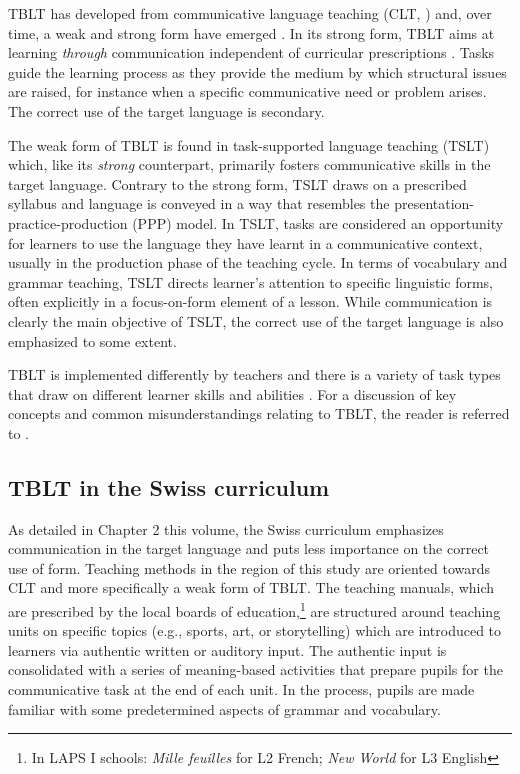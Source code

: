 \documentclass[output=paper]{langsci/langscibook}
\begin{document}
TBLT has developed from communicative language teaching (CLT, \citealt{Krashen1981}) and, over time, a weak and strong form have emerged \citep[109]{Ellis2017}. In its strong form, TBLT aims at learning \textit{through} communication independent of curricular prescriptions \citep{Ellis2017}. Tasks guide the learning process as they provide the medium by which structural issues are raised, for instance when a specific communicative need or problem arises. The correct use of the target language is secondary.

\begin{sloppypar}
The weak form of TBLT is found in task-supported language teaching (TSLT) which, like its \textit{strong} counterpart, primarily fosters communicative skills in the target language. Contrary to the strong form, TSLT draws on a prescribed syllabus and language is conveyed in a way that resembles the presentation-practice-production (PPP) model. In TSLT, tasks are considered an opportunity for learners to use the language they have learnt in a communicative context, usually in the production phase of the teaching cycle. In terms of vocabulary and grammar teaching, TSLT directs learner’s attention to specific linguistic forms, often explicitly in a focus-on-form element of a lesson. While communication is clearly the main objective of TSLT, the correct use of the target language is also emphasized to some extent. 
\end{sloppypar}

TBLT is implemented differently by teachers \citep{Ellis2009} and there is a variety of task types that draw on different learner skills and abilities \citep{Skehan1996}. For a discussion of key concepts and common misunderstandings relating to TBLT, the reader is referred to \citet{Ellis2009}.  

\subsection{TBLT in the Swiss curriculum}\label{sec:06:2.4}

As detailed in Chapter 2 this volume, the Swiss curriculum emphasizes communication in the target language and puts less importance on the correct use of form. Teaching methods in the region of this study are oriented towards CLT and more specifically a weak form of TBLT. The teaching manuals, which are prescribed by the local boards of education,\footnote{In LAPS I schools: \textit{Mille feuilles} \citep{BertschyEtAl2012} for L2 French; \textit{New World} \citep{ArnetClarkEtAl2013} for L3 English} are structured around teaching units on specific topics (e.g., sports, art, or storytelling) which are introduced to learners via authentic written or auditory input. The authentic input is consolidated with a series of meaning-based activities that prepare pupils for the communicative task at the end of each unit. In the process, pupils are made familiar with some predetermined aspects of grammar and vocabulary. 
\end{document}
